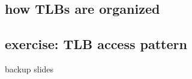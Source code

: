 \subsection{how TLBs are organized}

\subsection{exercise: TLB access pattern}



\begin{frame}{backup slides}
\end{frame}




